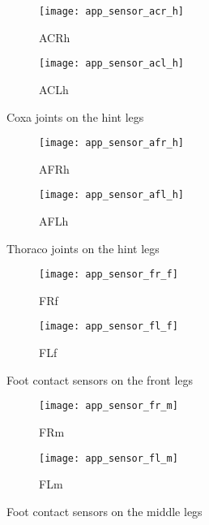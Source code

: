 \begin{figure}[H]
\centering
\begin{subfigure}{0.48\textwidth}
  \centering
  \texttt{[image: app\_sensor\_acr\_h]}
  \caption{ACRh}
  \label{fig:app_acr_h}
\end{subfigure}
\begin{subfigure}{0.48\textwidth}
  \centering
  \texttt{[image: app\_sensor\_acl\_h]}
  \caption{ACLh}
  \label{fig:app_acl_h}
\end{subfigure}
\caption{Coxa joints on the hint legs}
\label{fig:app_ac_h}
\end{figure}

\begin{figure}[H]
\centering
\begin{subfigure}{0.48\textwidth}
  \centering
  \texttt{[image: app\_sensor\_afr\_h]}
  \caption{AFRh}
  \label{fig:app_afr_h}
\end{subfigure}
\begin{subfigure}{0.48\textwidth}
  \centering
  \texttt{[image: app\_sensor\_afl\_h]}
  \caption{AFLh}
  \label{fig:app_afl_h}
\end{subfigure}
\caption{Thoraco joints on the hint legs}
\label{fig:app_af_h}
\end{figure}

\begin{figure}[H]
\centering
\begin{subfigure}{0.48\textwidth}
  \centering
  \texttt{[image: app\_sensor\_fr\_f]}
  \caption{FRf}
  \label{fig:app_fr_f}
\end{subfigure}
\begin{subfigure}{0.48\textwidth}
  \centering
  \texttt{[image: app\_sensor\_fl\_f]}
  \caption{FLf}
  \label{fig:app_fl_f}
\end{subfigure}
\caption{Foot contact sensors on the front legs}
\label{fig:app_f_f}
\end{figure}

\begin{figure}[H]
\centering
\begin{subfigure}{0.48\textwidth}
  \centering
  \texttt{[image: app\_sensor\_fr\_m]}
  \caption{FRm}
  \label{fig:app_fr_m}
\end{subfigure}
\begin{subfigure}{0.48\textwidth}
  \centering
  \texttt{[image: app\_sensor\_fl\_m]}
  \caption{FLm}
  \label{fig:app_fl_m}
\end{subfigure}
\caption{Foot contact sensors on the middle legs}
\label{fig:app_f_m}
\end{figure}

